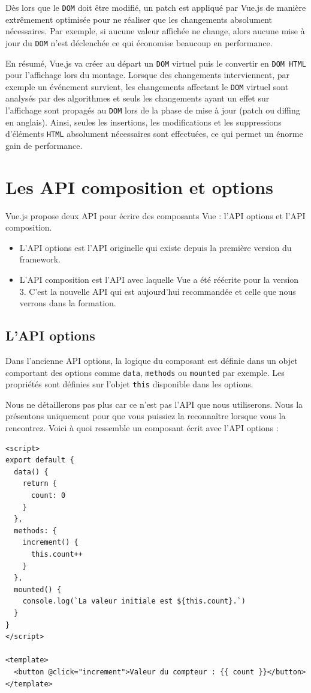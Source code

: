 Dès lors que le {\tt DOM} doit être modifié, un patch est appliqué par {\color{monOrange}Vue.js} de manière extrêmement optimisée pour ne réaliser que les changements absolument nécessaires. Par exemple, si aucune valeur affichée ne change, alors aucune mise à jour du {\tt DOM} n'est déclenchée ce qui économise beaucoup en performance.

En résumé, {\color{monOrange}Vue.js} va créer au départ un {\tt DOM} virtuel puis le convertir en {\tt DOM HTML} pour l'affichage lors du montage. Lorsque des changements interviennent, par exemple un événement survient, les changements affectant le {\tt DOM} virtuel sont analysés par des algorithmes et seuls les changements ayant un effet sur l'affichage sont propagés au {\tt DOM} lors de la phase de mise à jour (patch ou diffing en anglais). Ainsi, seules les insertions, les modifications et les suppressions d'éléments {\tt HTML} absolument nécessaires sont effectuées, ce qui permet un énorme gain de performance.


\section{Les API composition et options}
{\color{monOrange}Vue.js} propose deux API pour écrire des composants {\color{monOrange}Vue} : l'API options et l'API composition.
\begin{itemize}
\item L'API options est l'API originelle qui existe depuis la première version du {\color{monOrange}framework}.
\item L'API composition est l'API avec laquelle {\color{monOrange}Vue} a été réécrite pour la version 3. C'est la nouvelle API qui est aujourd'hui recommandée et celle que nous verrons dans la formation.
\end{itemize}
\subsection{L'API options}
Dans l'ancienne API options, la logique du composant est définie dans un objet comportant des options comme {\tt data}, {\tt methods} ou {\tt mounted} par exemple. Les propriétés sont définies sur l'objet {\tt this} disponible dans les options.

Nous ne détaillerons pas plus car ce n'est pas l'API que nous utiliserons. Nous la présentons uniquement pour que vous puissiez la reconnaître lorsque vous la rencontrez. Voici à quoi ressemble un composant écrit avec l'API options :
\begin{verbatim}
<script>
export default {
  data() {
    return {
      count: 0
    }
  },
  methods: {
    increment() {
      this.count++
    }
  },
  mounted() {
    console.log(`La valeur initiale est ${this.count}.`)
  }
}
</script>

<template>
  <button @click="increment">Valeur du compteur : {{ count }}</button>
</template>
\end{verbatim} 

